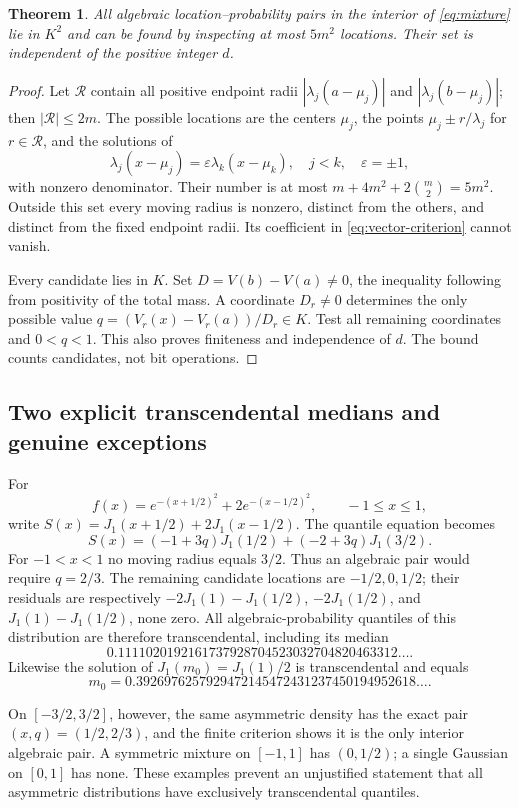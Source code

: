 \documentclass[11pt,a4paper]{article}
\numberwithin{equation}{section}
\newtheorem{theorem}{Theorem}[section]
\theoremstyle{definition}
\theoremstyle{remark}
\begin{document}
\begin{theorem}\label{thm:gauss-candidates}
All algebraic location--probability pairs in the interior of
\eqref{eq:mixture} lie in $K^2$ and can be found by inspecting at most $5m^2$
locations. Their set is independent of the positive integer $d$.
\end{theorem}
\begin{proof}
Let $\mathcal R$ contain all positive endpoint radii
$|\lambda_j(a-\mu_j)|$ and $|\lambda_j(b-\mu_j)|$; then
$|\mathcal R|\le2m$. The possible locations are the centers $\mu_j$, the
points $\mu_j\pm r/\lambda_j$ for $r\in\mathcal R$, and the solutions of
\[
 \lambda_j(x-\mu_j)=\varepsilon\lambda_k(x-\mu_k),
 \quad j<k,\quad\varepsilon=\pm1,
\]
with nonzero denominator. Their number is at most
$m+4m^2+2\binom m2=5m^2$. Outside this set every moving radius is nonzero,
distinct from the others, and distinct from the fixed endpoint radii. Its
coefficient in \eqref{eq:vector-criterion} cannot vanish.

Every candidate lies in $K$. Set $D=V(b)-V(a)\ne0$, the inequality following
from positivity of the total mass. A coordinate $D_r\ne0$ determines the
only possible value $q=(V_r(x)-V_r(a))/D_r\in K$. Test all remaining
coordinates and $0<q<1$. This also proves finiteness and independence of $d$.
The bound counts candidates, not bit operations.
\end{proof}

\subsection{Two explicit transcendental medians and genuine exceptions}
For
\[
 f(x)=e^{-(x+1/2)^2}+2e^{-(x-1/2)^2},\qquad -1\le x\le1,
\]
write $S(x)=J_1(x+1/2)+2J_1(x-1/2)$. The quantile equation becomes
\[
 S(x)=(-1+3q)J_1(1/2)+(-2+3q)J_1(3/2).
\]
For $-1<x<1$ no moving radius equals $3/2$. Thus an algebraic pair would
require $q=2/3$. The remaining candidate locations are $-1/2,0,1/2$; their
residuals are respectively
$-2J_1(1)-J_1(1/2)$, $-2J_1(1/2)$, and $J_1(1)-J_1(1/2)$, none zero.
All algebraic-probability quantiles of this distribution are therefore
transcendental, including its median
\[
 0.1111020192161737928704523032704820463312\ldots.
\]
Likewise the solution of $J_1(m_0)=J_1(1)/2$ is transcendental and equals
\[
 m_0=0.3926976257929472145472431237450194952618\ldots.
\]

On $[-3/2,3/2]$, however, the same asymmetric density has the exact pair
$(x,q)=(1/2,2/3)$, and the finite criterion shows it is the only interior
algebraic pair. A symmetric mixture on $[-1,1]$ has $(0,1/2)$; a single
Gaussian on $[0,1]$ has none. These examples prevent an unjustified statement
that all asymmetric distributions have exclusively transcendental quantiles.
\end{document}
